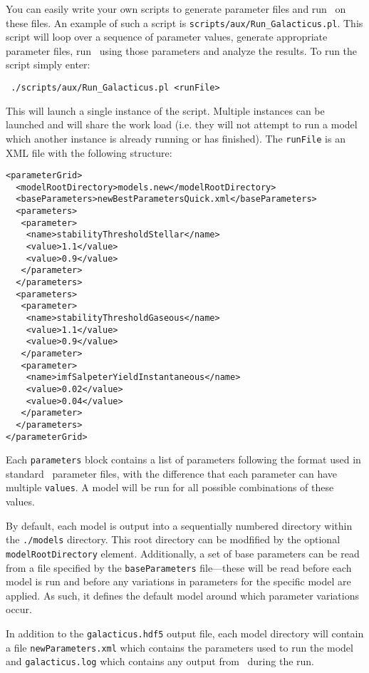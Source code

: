 You can easily write your own scripts to generate parameter files and run \glc\ on these files. An example of such a script is {\tt scripts/aux/Run\_Galacticus.pl}. This script will loop over a sequence of parameter values, generate appropriate parameter files, run \glc\ using those parameters and analyze the results. To run the script simply enter:
\begin{verbatim}
 ./scripts/aux/Run_Galacticus.pl <runFile>
\end{verbatim}
This will launch a single instance of the script. Multiple instances can be launched and will share the work load (i.e. they will not attempt to run a model which another instance is already running or has finished). The {\tt runFile} is an XML file with the following structure:
\begin{verbatim}
<parameterGrid>
  <modelRootDirectory>models.new</modelRootDirectory>
  <baseParameters>newBestParametersQuick.xml</baseParameters>
  <parameters>
   <parameter>
    <name>stabilityThresholdStellar</name>
    <value>1.1</value>
    <value>0.9</value>
   </parameter>
  </parameters>
  <parameters>
   <parameter>
    <name>stabilityThresholdGaseous</name>
    <value>1.1</value>
    <value>0.9</value>
   </parameter>
   <parameter>
    <name>imfSalpeterYieldInstantaneous</name>
    <value>0.02</value>
    <value>0.04</value>
   </parameter>
  </parameters>
</parameterGrid>
\end{verbatim}
Each {\tt parameters} block contains a list of parameters following the format used in standard \glc\ parameter files, with the difference that each parameter can have multiple {\tt values}. A model will be run for all possible combinations of these values.

By default, each model is output into a sequentially numbered directory within the {\tt ./models} directory. This root directory can be modfified by the optional {\tt modelRootDirectory} element. Additionally, a set of base parameters can be read from a file specified by the {\tt baseParameters} file---these will be read before each model is run and before any variations in parameters for the specific model are applied. As such, it defines the default model around which parameter variations occur.

In addition to the {\tt galacticus.hdf5} output file, each model directory will contain a file {\tt newParameters.xml} which contains the parameters used to run the model and {\tt galacticus.log} which contains any output from \glc\ during the run.

